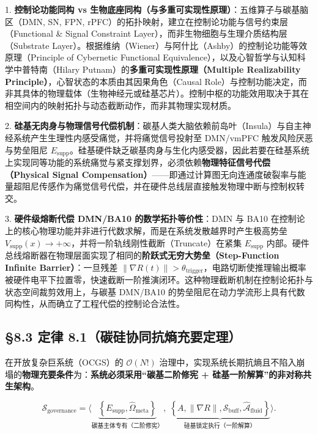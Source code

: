 \documentclass[11pt,a4paper,oneside]{ctexart}
\begin{document}
1. \textbf{控制论功能同构 vs 生物底座同构（与多重可实现性原理）}：五维算子与碳基脑区（DMN, SN, FPN, rPFC）的拓扑映射，建立在控制论功能与信号约束层（Functional \& Signal Constraint Layer），而非生物细胞与生理介质结构层（Substrate Layer）。根据维纳（Wiener）与阿什比（Ashby）的控制论功能等效原理（Principle of Cybernetic Functional Equivalence），以及心智哲学与认知科学中普特南（Hilary Putnam）的\textbf{多重可实现性原理（Multiple Realizability Principle）}，心智状态的本质由其因果角色（Causal Role）与控制功能决定，而非其具体的物理载体（生物神经元或硅基芯片）。控制中枢的功能效用取决于其在相空间内的映射拓扑与动态截断动作，而非其物理实现材质。

2. \textbf{硅基无肉身与物理信号代偿机制}：碳基人类大脑依赖前岛叶（Insula）与自主神经系统产生生理性内感受痛觉，并将痛觉信号投射至 DMN/vmPFC 触发风险厌恶与势垒阻尼 $E_{\text{supp}}$。硅基硬件缺乏碳基肉身与生化内感受器，因此若要在硅基系统上实现同等功能的系统痛觉与紧支撑划界，必须依赖\textbf{物理特征信号代偿（Physical Signal Compensation）}------即通过计算图无向连通度破裂率与能量超阻尼传感作为痛觉信号代偿，并在硬件总线层直接触发物理中断与控制权转交。

3. \textbf{硬件级熔断代偿 DMN/BA10 的数学拓扑等价性}：DMN 与 BA10 在控制论上的核心物理功能并非进行代数求解，而是在系统发散越界时产生极高势垒 $V_{\text{supp}}(x) \to +\infty$，并将一阶轨线刚性截断（Truncate）在紧集 $E_{\text{supp}}$ 内部。硬件总线熔断器在物理层面实现了相同的\textbf{阶跃式无穷大势垒（Step-Function Infinite Barrier）}：一旦残差 $\|\nabla R(t)\| > \theta_{\text{trigger}}$，电路切断使推理输出概率被硬件电平下拉置零，快速截断一阶推演闭环。这种物理截断机制在控制论拓扑与状态空间裁剪效用上，与碳基 DMN/BA10 的势垒阻尼在动力学流形上具有代数同构性，从而确立了工程代偿的控制论合法性。


\subsection{§8.3 定律 8.1（碳硅协同抗熵充要定理）}

在开放复杂巨系统（OCGS）的 $\mathcal{O}(N!)$ 治理中，实现系统长期抗熵且不陷入崩塌的\textbf{物理充要条件}为：\textbf{系统必须采用“碳基二阶修宪 + 硅基一阶解算”的非对称共生架构}。


\begin{equation}
\mathcal{S}_{\text{governance}} = \Big\langle \underbrace{\left\{ E_{\text{supp}}, \hat{\Omega}_{\text{meta}} \right\}}_{\text{碳基主体专有（二阶修宪）}}, \; \underbrace{\left\{ A, \|\nabla R\|, \mathcal{S}_{\text{buff}}, \hat{\mathcal{A}}_{\text{fluid}} \right\}}_{\text{硅基锁定执行（一阶解算）}} \Big\rangle.
\end{equation}
\end{document}
